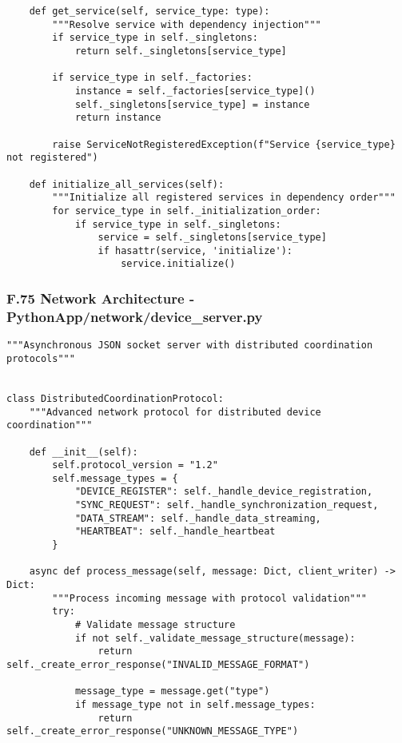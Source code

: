 \documentclass[11pt,a4paper]{report}
\begin{document}
{{\begin{verbatim}
    def get_service(self, service_type: type):
        """Resolve service with dependency injection"""
        if service_type in self._singletons:
            return self._singletons[service_type]

        if service_type in self._factories:
            instance = self._factories[service_type]()
            self._singletons[service_type] = instance
            return instance

        raise ServiceNotRegisteredException(f"Service {service_type} not registered")

    def initialize_all_services(self):
        """Initialize all registered services in dependency order"""
        for service_type in self._initialization_order:
            if service_type in self._singletons:
                service = self._singletons[service_type]
                if hasattr(service, 'initialize'):
                    service.initialize()
\end{verbatim}

\subsubsection{F.75 Network Architecture - PythonApp/network/device_server.py}

\begin{verbatim}
"""Asynchronous JSON socket server with distributed coordination protocols"""


class DistributedCoordinationProtocol:
    """Advanced network protocol for distributed device coordination"""

    def __init__(self):
        self.protocol_version = "1.2"
        self.message_types = {
            "DEVICE_REGISTER": self._handle_device_registration,
            "SYNC_REQUEST": self._handle_synchronization_request,
            "DATA_STREAM": self._handle_data_streaming,
            "HEARTBEAT": self._handle_heartbeat
        }

    async def process_message(self, message: Dict, client_writer) -> Dict:
        """Process incoming message with protocol validation"""
        try:
            # Validate message structure
            if not self._validate_message_structure(message):
                return self._create_error_response("INVALID_MESSAGE_FORMAT")

            message_type = message.get("type")
            if message_type not in self.message_types:
                return self._create_error_response("UNKNOWN_MESSAGE_TYPE")


\end{verbatim}}}
\end{document}
